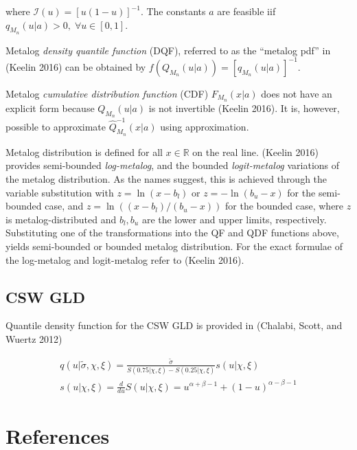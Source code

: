 \documentclass[
]{interact}
\begin{document}
where \(\mathcal I(u)=[u(1-u)]^{-1}\). The constants \(a\) are feasible
iif \(q_{M_{n}}(u\vert a)>0, \;\forall u \in [0,1]\).

Metalog \emph{density quantile function} (DQF), referred to as the
``metalog pdf'' in (Keelin 2016) can be obtained by
\(f(Q_{M_n}(u\vert a))=[q_{M_n}(u\vert a)]^{-1}\).

Metalog \emph{cumulative distribution function} (CDF)
\(F_{M_n}(x\vert a)\) does not have an explicit form because
\(Q_{M_n}(u\vert a)\) is not invertible (Keelin 2016). It is, however,
possible to approximate \(\widehat Q^{-1}_{M_n}(x\vert a)\) using
approximation.

Metalog distribution is defined for all \(x \in \mathbb R\) on the real
line. (Keelin 2016) provides semi-bounded \emph{log-metalog}, and the
bounded \emph{logit-metalog} variations of the metalog distribution. As
the names suggest, this is achieved through the variable substitution
with \(z=\ln(x-b_l)\) or \(z=-\ln(b_u-x)\) for the semi-bounded case,
and \(z=\ln((x-b_l)/(b_u-x))\) for the bounded case, where \(z\) is
metalog-distributed and \(b_l, b_u\) are the lower and upper limits,
respectively. Substituting one of the transformations into the QF and
QDF functions above, yields semi-bounded or bounded metalog
distribution. For the exact formulae of the log-metalog and
logit-metalog refer to (Keelin 2016).

\subsection*{CSW GLD}\label{csw-gld}

Quantile density function for the CSW GLD is provided in (Chalabi,
Scott, and Wuertz 2012)

\[
\begin{gathered}
q(u\vert\tilde\sigma,\chi,\xi)= \frac{\tilde\sigma}{S(0.75\vert\chi,\xi)-S(0.25\vert\chi,\xi)}
s(u\vert\chi,\xi) \\
s(u\vert\chi,\xi)=\frac{d}{du}S(u\vert\chi,\xi)=u^{\alpha+\beta-1}+(1-u)^{\alpha-\beta-1}
\end{gathered}
\]

\newpage{}

\section*{References}\label{references}
\end{document}
